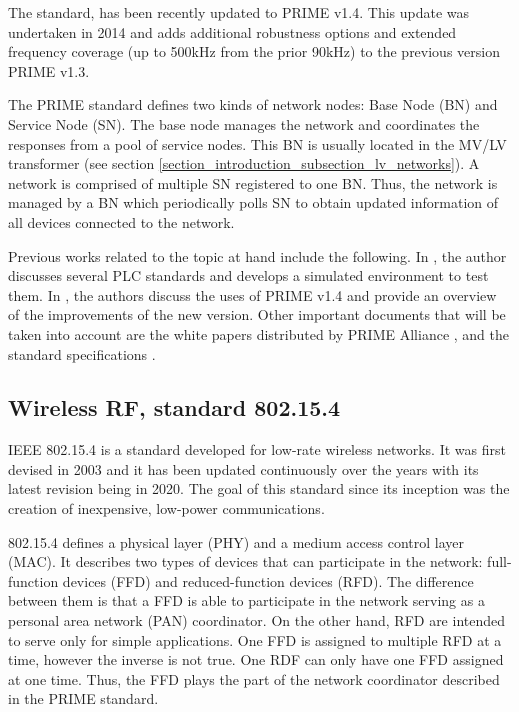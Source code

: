 The standard, has been recently updated to PRIME v1.4. This update was undertaken in 2014 \cite{prime_v14_evolution_a_future__proof_of_reality_beyond_metering} and adds additional robustness options and extended frequency coverage (up to 500kHz from the prior 90kHz) to the previous version PRIME v1.3.

The PRIME standard defines two kinds of network nodes: Base Node (BN) and Service Node (SN). The base node manages the network and coordinates the responses from a pool of service nodes. This BN is usually located in the MV/LV transformer (see section \ref{section_introduction_subsection_lv_networks}). A network is comprised of multiple SN registered to one BN. Thus, the network is managed by a BN which periodically polls SN to obtain updated information of all devices connected to the network.

Previous works related to the topic at hand include the following. In \cite{tesis_jmatanza}, the author discusses several PLC standards and develops a simulated environment to test them. In \cite{prime_v14_evolution_a_future__proof_of_reality_beyond_metering}, the authors discuss the uses of PRIME v1.4 and provide an overview of the improvements of the new version. Other important documents that will be taken into account are the white papers distributed by PRIME Alliance \cite{primeWhitePaper}, and the standard specifications \cite{prime_v14_specifications}.


\subsection{Wireless RF, standard 802.15.4}\label{section_state_of_the_art_subsection_802}
IEEE 802.15.4 is a standard developed for low-rate wireless networks. It was first devised in 2003 and it has been updated continuously over the years with its latest revision being in 2020. The goal of this standard since its inception was the creation of inexpensive, low-power communications.

802.15.4 defines a physical layer (PHY) and a medium access control layer (MAC). It describes two types of devices that can participate in the network: full-function devices (FFD) and reduced-function devices (RFD). The difference between them is that a FFD is able to participate in the network serving as a personal area network (PAN) coordinator. On the other hand, RFD are intended to serve only for simple applications. One FFD is assigned to multiple RFD at a time, however the inverse is not true. One RDF can only have one FFD assigned at one time. Thus, the FFD plays the part of the network coordinator described in the PRIME standard.

